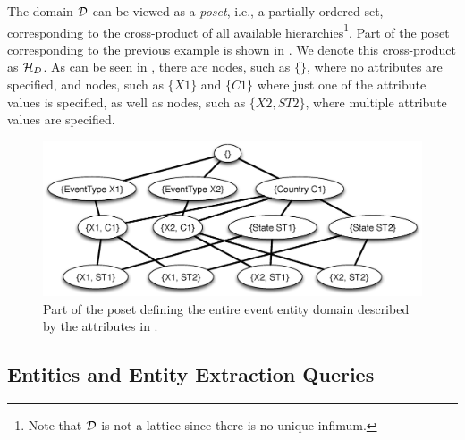The domain $\mathcal{D}$ can be viewed as a {\em poset}, i.e., a partially ordered set, corresponding to the cross-product of all available hierarchies\footnote{Note that $\mathcal{D}$ is not a lattice since there is no unique infimum.}. Part of the poset corresponding to the previous example is shown in . We denote this cross-product as $\mathcal{H}_D$. As can be seen in , there are nodes, such as $\{\}$, where no attributes are specified, and nodes, such as $\{X1\}$ and $\{C1\}$ where just one of the attribute values is specified, as well as nodes, such as $\{X2, ST2\}$, where multiple attribute values are specified.




\begin{figure}[h]
	\begin{center}
	\includegraphics[clip,scale=0.32]{figs/eventsExLattice.eps}
	\caption{Part of the poset defining the entire event entity domain described by the attributes in .}
	\label{fig:eventslattice}
	\end{center}
	\vspace{-10pt}
\end{figure}


\subsection{Entities and Entity Extraction Queries}
\label{sec:queries}

